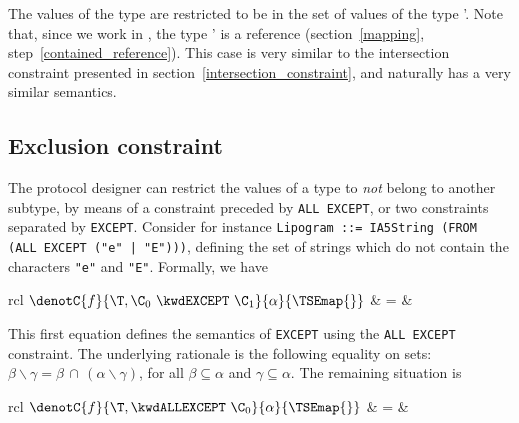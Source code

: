 \medskip

\noindent
The values of the type \T{} are restricted to be in the set of values
of the type \T'{}. Note that, since we work in \core, the type
\T'{} is a reference (section~\ref{mapping},
step~\ref{contained_reference}). This case is very similar to the
intersection constraint presented in
section~\ref{intersection_constraint}, and naturally has a very
similar semantics.


\subsection{Exclusion constraint}\label{complement_constraint}

The protocol designer can restrict the values of a type to \emph{not}
belong to another subtype, by means of a constraint preceded by
\texttt{\small ALL EXCEPT}, or two constraints separated by
\texttt{\small EXCEPT}. Consider for instance \texttt{\small Lipogram
  ::= IA5String (FROM (ALL EXCEPT ("e" | "E")))}, defining the
set of strings which do not contain the characters \texttt{\small "e"}
and \texttt{\small "E"}. Formally, we have

\medskip

\noindent
\begin{tabular}{rcl}
     $\denotC{f}{\T,\C_0 \,\, \kwdEXCEPT \,\, \C_1}{\alpha}{\TSEmap{}}$
  & \hspace*{-4mm} = &\\ 
\end{tabular}

\medskip

\noindent
This first equation defines the semantics of \texttt{\small EXCEPT}
using the \texttt{\small ALL EXCEPT} constraint. The underlying
ratio\-nale is the following equality on sets: $\beta \backslash
\gamma = \beta \, \cap \, (\alpha \backslash \gamma)$, for all $\beta
\subseteq \alpha$ and $\gamma \subseteq \alpha$. The remaining
situation is

\medskip

\noindent
\begin{tabular}{rcl}
    $\denotC{f}{\T,\kwdALLEXCEPT \,\, \C_0}{\alpha}{\TSEmap{}}$
  & \hspace*{-4mm} = & \\
\end{tabular}

